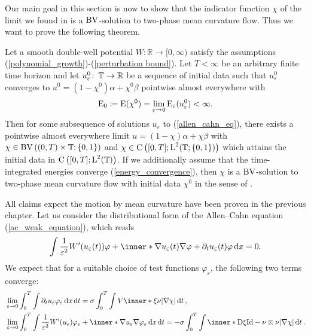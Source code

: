 Our main goal in this section is now to show that the indicator function $ \chi 
$ of the limit we
found in  is a $ \operatorname{BV} $-solution to two-phase 
mean curvature flow. Thus we want to prove the following theorem.
\begin{theorem}
	\label{convergence_to_twophase_mcf}
	Let a smooth double-well potential $ W \colon \mathbb{ R } \to [ 0, \infty 
	) 
	$ satisfy the assumptions (\ref{polynomial_growth})-(\ref{perturbation 
		bound}). 
	Let $ T < \infty $ be an arbitrary finite time horizon and let
	 $ u_{ \varepsilon }^{ 0 } \colon \operatorname{\mathbb{T}} \to 
	\mathbb{ R } $ be a sequence of initial data such that $ u_{ \varepsilon 
	}^{ 0 } $ converges to $ u^{ 0 } 
	= ( 1- 
	\chi^{ 0} ) \alpha 
	+ \chi^{ 0 } \beta $ pointwise almost everywhere with 
	\begin{equation*}
		\operatorname{E}_{ 0 }
		\coloneqq
		\operatorname{E} ( \chi^{ 0 } )
		=
		\lim_{ \varepsilon \to 0 }
		\operatorname{E}_{ \varepsilon } ( u_{ \varepsilon}^{ 0 } )
		< 
		\infty.
	\end{equation*}
	Then for some subsequence of solutions $ u_{ \varepsilon } $ 
	to 
	(\ref{allen_cahn_eq}), there exists a pointwise 
	almost everywhere limit $ u = ( 1 - \chi ) \alpha + \chi \beta $ with $ 
	\chi \in \operatorname{BV} \left( ( 0, T ) \times \operatorname{\mathbb{T}} ; \{ 0 , 1 \} \right) $ and
	$ \chi \in \operatorname{C} \left( [ 0 , T ] ; \operatorname{L}^{ 2 } (\operatorname{\mathbb{T}} ; \{ 0 , 1 \} ) 
	\right) $ which attains the initial data in $ \operatorname{C} \left( [ 0, T ] ; 
	\operatorname{L}^{ 2 }( \operatorname{\mathbb{T}} ) \right) $. If we additionally assume that the 
	time-integrated energies converge (\ref{energy_convergence}), then $ \chi 
	$ is a $ \operatorname{BV} $-solution to two-phase mean curvature flow with initial data 
	$ \chi^{ 0 } $ in the sense of .
\end{theorem} 
All claims expect the motion by mean curvature have been proven in the previous 
chapter.
Let us consider the distributional form of the Allen--Cahn equation 
(\ref{ac_weak_equation}), which reads
\begin{equation*}
	\int
	\frac{ 1 }{ \varepsilon^{ 2 } } W' ( u_{ \varepsilon} ( t ) ) \varphi
	+
	\inner*{ \nabla u_{ \varepsilon } ( t ) }{\nabla \varphi }
	+
	\partial_{ t } u_{ \varepsilon} ( t ) \varphi 
	\dd{x}
	=
	0.
\end{equation*}
We expect that for a suitable choice of test functions $ \varphi_{ \varepsilon 
} 
$, the following two terms converge:
\begin{align*}
	& \lim_{ \varepsilon \to 0 }
	\int_{ 0 }^{ T }
	\int 
	\partial_{ t } u_{ \varepsilon } \varphi_{ \varepsilon }
	\dd{ x }
	\dd{ t }
	=
	\sigma
	\int_{ 0 }^{ T }
	\int
	V \inner*{ \xi }{ \nu }
	\abs{ \nabla \chi }
	\dd{ t },
	\\
	& \lim_{ \varepsilon \to 0 }
	\int_{ 0 }^{ T }
	\int
	\frac{1 }{ \varepsilon^{ 2 } }
	W'( u_{ \varepsilon } )
	\varphi_{ \varepsilon}
	+ 
	\inner*{ \nabla u_{ \varepsilon } }{ \nabla \varphi_{ \varepsilon } }
	\dd{ x }
	\dd{ t }
	=
	- 
	\sigma \int_{ 0 }^{ T }
	\int
	\inner*{ \diff \xi }{ \mathrm{Id} - \nu \otimes \nu }
	\abs{ \nabla \chi }
	\dd{ t }.
\end{align*}
